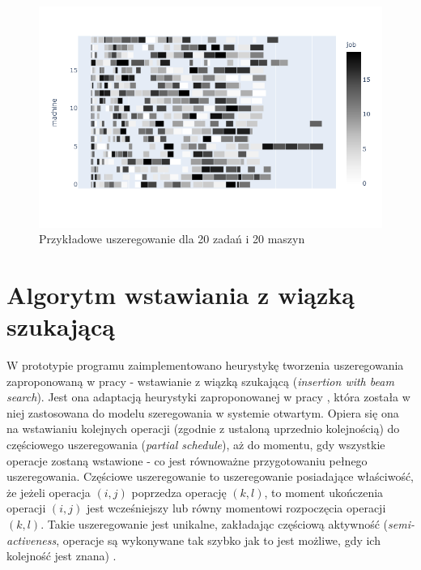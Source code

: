 \documentclass[brudnopis]{xmgr}
\begin{document}
\begin{figure}[!tbh]
\centering
\includegraphics[width=.8\hsize]{fig/newplot_trim20j20m.png}
\caption{Przykładowe uszeregowanie dla 20 zadań i 20 maszyn\label{diag:sched_20j420}}
\end{figure}
\medskip



\chapter{Algorytm wstawiania z wiązką szukającą}

W prototypie programu zaimplementowano heurystykę tworzenia uszeregowania zaproponowaną w pracy \cite{grinshpoun2014partially} - wstawianie z wiązką szukającą (\emph{insertion with beam search}).
Jest ona adaptacją heurystyki zaproponowanej w pracy \cite{brasel1993constructive}, która została w niej zastosowana do modelu szeregowania w systemie otwartym.
Opiera się ona na wstawianiu kolejnych operacji (zgodnie z ustaloną uprzednio kolejnością) do częściowego uszeregowania (\emph{partial schedule}), aż do momentu, gdy wszystkie operacje zostaną wstawione - co jest równoważne przygotowaniu pełnego uszeregowania. Częściowe uszeregowanie to uszeregowanie posiadające właściwość, że jeżeli operacja $(i,j)$ poprzedza operację $(k,l)$, to moment ukończenia operacji $(i,j)$ jest wcześniejszy lub równy momentowi rozpoczęcia operacji $(k,l)$. Takie uszeregowanie jest unikalne, zakładając częściową aktywność (\emph{semi-activeness}, operacje są wykonywane tak szybko jak to jest możliwe, gdy ich kolejność jest znana) \cite{grinshpoun2014partially}.\\
\end{document}
